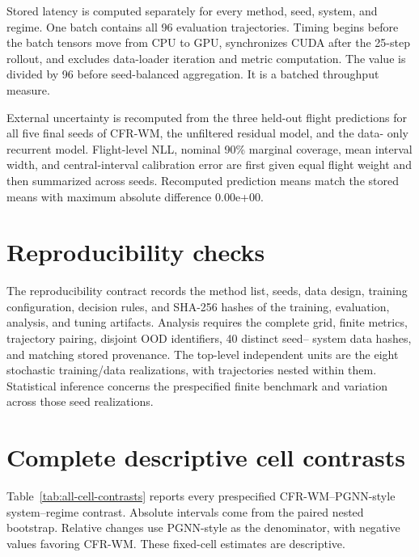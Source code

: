 \documentclass[pdflatex,sn-basic]{sn-jnl}
\newcommand{\ExternalMeanReconstructionDifference}{0.00e+00}
\begin{document}
\begin{appendices}
Stored latency is computed separately for every method, seed, system, and
regime. One batch contains all 96 evaluation trajectories. Timing begins before
the batch tensors move from CPU to GPU, synchronizes CUDA after the 25-step
rollout, and excludes data-loader iteration and metric computation. The value
is divided by 96 before seed-balanced aggregation. It is a batched throughput
measure.

External uncertainty is recomputed from the three held-out flight predictions
for all five final seeds of CFR-WM, the unfiltered residual model, and the data-
only recurrent model. Flight-level NLL, nominal 90\% marginal coverage, mean
interval width, and central-interval calibration error are first given equal
flight weight and then summarized across seeds. Recomputed prediction means
match the stored means with maximum absolute difference
\ExternalMeanReconstructionDifference{}.

\section{Reproducibility checks}

The reproducibility contract records the method list, seeds, data design,
training configuration, decision rules, and SHA-256 hashes of the training,
evaluation, analysis, and tuning artifacts. Analysis requires the complete grid,
finite metrics, trajectory pairing, disjoint OOD identifiers, 40 distinct seed--
system data hashes, and matching stored provenance. The top-level independent
units are the eight stochastic training/data realizations, with trajectories
nested within them. Statistical inference concerns the prespecified finite
benchmark and variation across those seed realizations.

\section{Complete descriptive cell contrasts}

Table~\ref{tab:all-cell-contrasts} reports every prespecified CFR-WM--PGNN-style
system--regime contrast. Absolute intervals come from the paired nested
bootstrap. Relative changes use PGNN-style as the denominator, with negative values
favoring CFR-WM. These fixed-cell estimates are descriptive.


\end{appendices}
\end{document}

